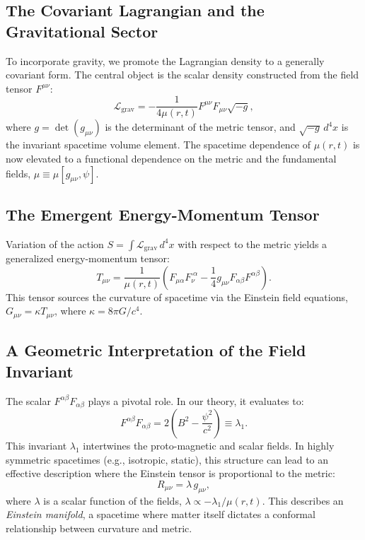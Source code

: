 \documentclass[12pt, a4paper]{article}
\begin{document}
\subsection{The Covariant Lagrangian and the Gravitational Sector}
To incorporate gravity, we promote the Lagrangian density to a generally covariant form. The central object is the scalar density constructed from the field tensor $F^{\mu\nu}$:
\begin{equation}
\mathcal{L}_{\text{grav}} = -\frac{1}{4\mu(r,t)} F^{\mu\nu}F_{\mu\nu} \sqrt{-g},
\end{equation}
where $g = \det(g_{\mu\nu})$ is the determinant of the metric tensor, and $\sqrt{-g}\,d^4x$ is the invariant spacetime volume element. The spacetime dependence of $\mu(r,t)$ is now elevated to a functional dependence on the metric and the fundamental fields, $\mu \equiv \mu[g_{\mu\nu}, \psi]$.

\subsection{The Emergent Energy-Momentum Tensor}
Variation of the action $S = \int \mathcal{L}_{\text{grav}} \, d^4x$ with respect to the metric yields a generalized energy-momentum tensor:
\begin{equation}
T_{\mu\nu} = \frac{1}{\mu(r,t)} \left( F_{\mu\alpha}F_{\nu}^{\;\alpha} - \frac{1}{4} g_{\mu\nu} F_{\alpha\beta}F^{\alpha\beta} \right).
\end{equation}
This tensor sources the curvature of spacetime via the Einstein field equations, $G_{\mu\nu} = \kappa T_{\mu\nu}$, where $\kappa = 8\pi G/c^4$.

\subsection{A Geometric Interpretation of the Field Invariant}
The scalar $F^{\alpha\beta}F_{\alpha\beta}$ plays a pivotal role. In our theory, it evaluates to:
\begin{equation}
F^{\alpha\beta}F_{\alpha\beta} = 2\left(B^2 - \frac{\psi^2}{c^2}\right) \equiv \lambda_1.
\end{equation}
This invariant $\lambda_1$ intertwines the proto-magnetic and scalar fields. In highly symmetric spacetimes (e.g., isotropic, static), this structure can lead to an effective description where the Einstein tensor is proportional to the metric:
\begin{equation}
R_{\mu\nu} = \lambda\, g_{\mu\nu},
\end{equation}
where $\lambda$ is a scalar function of the fields, $\lambda \propto -\lambda_1 / \mu(r,t)$. This describes an \textit{Einstein manifold}, a spacetime where matter itself dictates a conformal relationship between curvature and metric.
\end{document}
